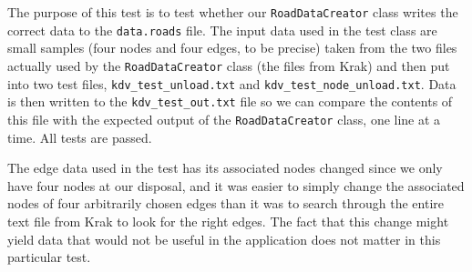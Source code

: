 The purpose of this test is to test whether our \texttt{RoadDataCreator} class writes the correct data to the \texttt{data.roads} file. The input data used in the test class are small samples (four nodes and four edges, to be precise) taken from the two files actually used by the \texttt{RoadDataCreator} class (the files from Krak) and then put into two test files, \texttt{kdv\_test\_unload.txt} and \texttt{kdv\_test\_node\_unload.txt}. Data is then written to the \texttt{kdv\_test\_out.txt} file so we can compare the contents of this file with the expected output of the \texttt{RoadDataCreator} class, one line at a time. All tests are passed.

The edge data used in the test has its associated nodes changed since we only have four nodes at our disposal, and it was easier to simply change the associated nodes of four arbitrarily chosen edges than it was to search through the entire text file from Krak to look for the right edges. The fact that this change might yield data that would not be useful in the application does not matter in this particular test.
